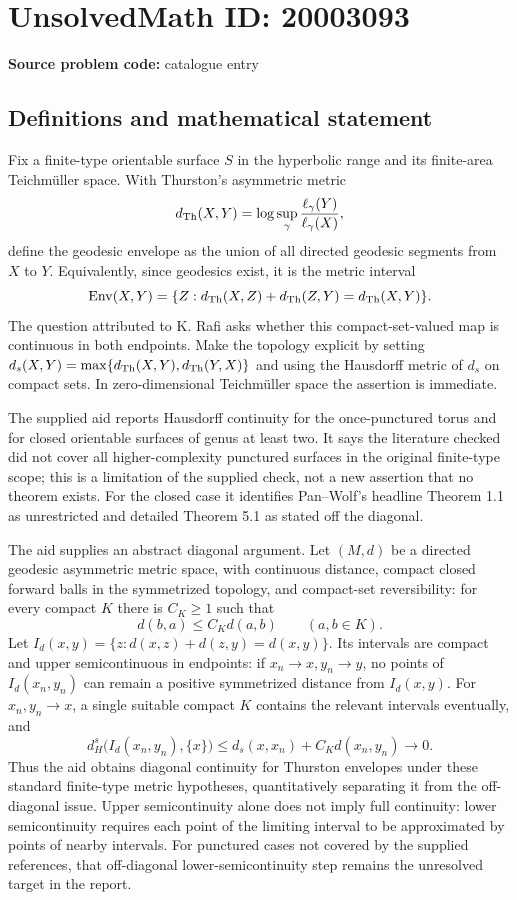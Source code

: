 \documentclass[11pt]{article}
\begin{document}
\section*{UnsolvedMath ID: 20003093}
\textbf{Source problem code:} catalogue entry
\subsection{Definitions and mathematical statement}
Fix a finite-type orientable surface \(S\) in the hyperbolic range and its finite-area Teichm\"uller space. With Thurston's asymmetric metric
\[
d_{\rm Th}(X,Y)=\log\sup_{\gamma}\frac{\ell_\gamma(Y)}{\ell_\gamma(X)},
\]
define the geodesic envelope as the union of all directed geodesic segments from \(X\) to \(Y\). Equivalently, since geodesics exist, it is the metric interval
\[
\operatorname{Env}(X,Y)=\{Z:d_{\rm Th}(X,Z)+d_{\rm Th}(Z,Y)=d_{\rm Th}(X,Y)\}.
\]
The question attributed to K. Rafi asks whether this compact-set-valued map is continuous in both endpoints. Make the topology explicit by setting \(d_s(X,Y)=\max\{d_{\rm Th}(X,Y),d_{\rm Th}(Y,X)\}\) and using the Hausdorff metric of \(d_s\) on compact sets. In zero-dimensional Teichm\"uller space the assertion is immediate.

The supplied aid reports Hausdorff continuity for the once-punctured torus and for closed orientable surfaces of genus at least two. It says the literature checked did not cover all higher-complexity punctured surfaces in the original finite-type scope; this is a limitation of the supplied check, not a new assertion that no theorem exists. For the closed case it identifies Pan--Wolf's headline Theorem 1.1 as unrestricted and detailed Theorem 5.1 as stated off the diagonal.

The aid supplies an abstract diagonal argument. Let \((M,d)\) be a directed geodesic asymmetric metric space, with continuous distance, compact closed forward balls in the symmetrized topology, and compact-set reversibility: for every compact \(K\) there is \(C_K\ge1\) such that
\[
d(b,a)\le C_Kd(a,b)\qquad(a,b\in K).
\]
Let \(I_d(x,y)=\{z:d(x,z)+d(z,y)=d(x,y)\}\). Its intervals are compact and upper semicontinuous in endpoints: if \(x_n\to x,y_n\to y\), no points of \(I_d(x_n,y_n)\) can remain a positive symmetrized distance from \(I_d(x,y)\). For \(x_n,y_n\to x\), a single suitable compact \(K\) contains the relevant intervals eventually, and
\[
d_H^s\bigl(I_d(x_n,y_n),\{x\}\bigr)
\le d_s(x,x_n)+C_Kd(x_n,y_n)\longrightarrow0.
\]
Thus the aid obtains diagonal continuity for Thurston envelopes under these standard finite-type metric hypotheses, quantitatively separating it from the off-diagonal issue. Upper semicontinuity alone does not imply full continuity: lower semicontinuity requires each point of the limiting interval to be approximated by points of nearby intervals. For punctured cases not covered by the supplied references, that off-diagonal lower-semicontinuity step remains the unresolved target in the report.
\end{document}
